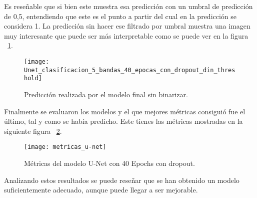 Es reseñable que si bien este muestra esa predicción con un umbral de predicción de 0,5, entendiendo que este es el punto a partir del cual en la predicción se considera 1. La predicción sin hacer ese filtrado por umbral muestra una imagen muy interesante que puede ser más interpretable como se puede ver en la figura ~\ref{fig:prediccion_sin_umbral}.
	
\begin{figure}[H]
	\centering
	\texttt{[image: Unet\_clasificacion\_5\_bandas\_40\_epocas\_con\_dropout\_din\_threshold]}
	\caption[Predicción realizada por el modelo final sin binarizar]{Predicción realizada por el modelo final sin binarizar.}
	\label{fig:prediccion_sin_umbral}
\end{figure}

Finalmente se evaluaron los modelos y el que mejores métricas consiguió fue el último, tal y como se había predicho. Este tienes las métricas mostradas en la siguiente figura  ~\ref{fig:metricas_u-net}.

\begin{figure}[H]
	\centering
	\texttt{[image: metricas\_u-net]}
	\caption[Métricas del modelo U-Net con 40 Epochs]{Métricas del modelo U-Net con 40 Epochs con dropout.}
	\label{fig:metricas_u-net}
\end{figure}

Analizando estos resultados se puede reseñar que se han obtenido un modelo suficientemente adecuado, aunque puede llegar a ser mejorable.